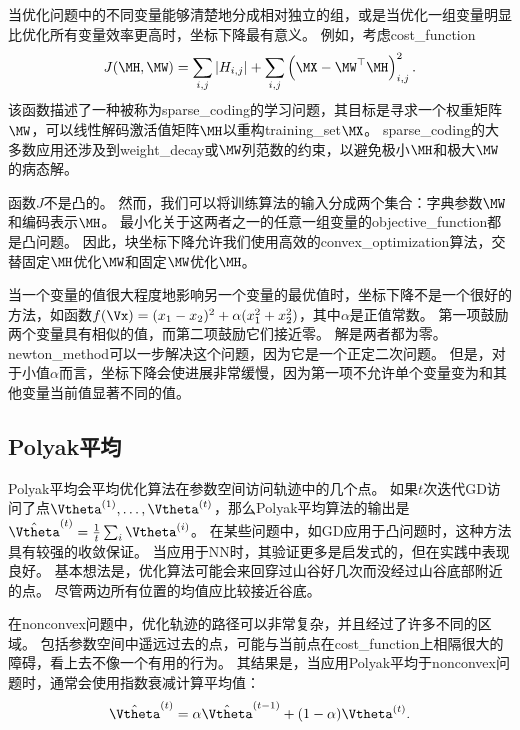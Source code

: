 当优化问题中的不同变量能够清楚地分成相对独立的组，或是当优化一组变量明显比优化所有变量效率更高时，坐标下降最有意义。
例如，考虑\gls{cost_function}
\begin{equation}
    J(\MH, \MW) = \sum_{i,j} |H_{i,j}| + \sum_{i,j} \left( \MX - \MW^\top \MH \right)_{i,j}^2 .
\end{equation}
该函数描述了一种被称为\gls{sparse_coding}的学习问题，其目标是寻求一个权重矩阵$\MW$，可以线性解码激活值矩阵$\MH$以重构\gls{training_set}$\MX$。
\gls{sparse_coding}的大多数应用还涉及到\gls{weight_decay}或$\MW$列范数的约束，以避免极小$\MH$和极大$\MW$的病态解。

函数$J$不是凸的。
然而，我们可以将训练算法的输入分成两个集合：字典参数$\MW$和编码表示$\MH$。
最小化关于这两者之一的任意一组变量的\gls{objective_function}都是凸问题。
因此，块坐标下降允许我们使用高效的\gls{convex_optimization}算法，交替固定$\MH$优化$\MW$和固定$\MW$优化$\MH$。

当一个变量的值很大程度地影响另一个变量的最优值时，坐标下降不是一个很好的方法，如函数$f(\Vx)=(x_1 - x_2)^2+\alpha(x_1^2 + x_2^2)$，其中$\alpha$是正值常数。
第一项鼓励两个变量具有相似的值，而第二项鼓励它们接近零。
解是两者都为零。
\gls{newton_method}可以一步解决这个问题，因为它是一个正定二次问题。
但是，对于小值$\alpha$而言，坐标下降会使进展非常缓慢，因为第一项不允许单个变量变为和其他变量当前值显著不同的值。


\subsection{Polyak平均}
\label{sec:polyak_averaging}
Polyak平均\citep{Polyak-Juditsky-1992}会平均优化算法在参数空间访问轨迹中的几个点。
如果$t$次迭代\gls{GD}访问了点$\Vtheta^{(1)},\dots,\Vtheta^{(t)}$，那么Polyak平均算法的输出是$\hat{\Vtheta}^{(t)} = \frac{1}{t} \sum_i \Vtheta^{(i)}$。
在某些问题中，如\gls{GD}应用于凸问题时，这种方法具有较强的收敛保证。
当应用于\gls{NN}时，其验证更多是启发式的，但在实践中表现良好。
基本想法是，优化算法可能会来回穿过山谷好几次而没经过山谷底部附近的点。
尽管两边所有位置的均值应比较接近谷底。


在\gls{nonconvex}问题中，优化轨迹的路径可以非常复杂，并且经过了许多不同的区域。
包括参数空间中遥远过去的点，可能与当前点在\gls{cost_function}上相隔很大的障碍，看上去不像一个有用的行为。
其结果是，当应用Polyak平均于\gls{nonconvex}问题时，通常会使用指数衰减计算平均值：
\begin{equation}
    \hat{\Vtheta}^{(t)} = \alpha \hat{\Vtheta}^{(t-1)} + (1-\alpha) \Vtheta^{(t)} .
\end{equation}

